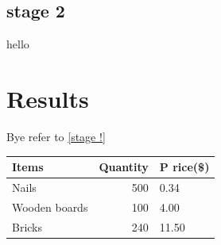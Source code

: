 \documentclass[a4paper,12pt]{article}
\begin{document}
\subsection{stage 2}
hello

\newpage
\section{Results}
Bye refer to \ref{stage !}

\begin{tabular}{|l|r|l|}
\hline
Items & Quantity & P rice(\$)\\
\hline
Nails & 500 & 0.34\\
Wooden boards & 100 & 4.00\\
Bricks & 240 & 11.50\\
\hline
\end{tabular}
\end{document}
